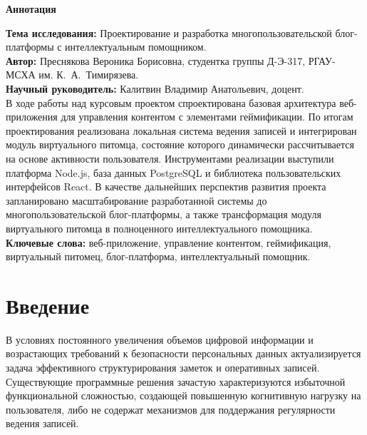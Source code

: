 \documentclass[a4paper,14pt]{extreport}
\begin{document}
\newpage
\thispagestyle{empty}
\begin{center}
  {\fontsize{16pt}{20pt}\selectfont\bfseries Аннотация\par}
\end{center}
\vspace{3mm}

\noindent\textbf{Тема исследования:} Проектирование и разработка многопользовательской блог-платформы с интеллектуальным помощником.\\[2mm]
\noindent\textbf{Автор:} Преснякова Вероника Борисовна, студентка группы Д-Э-317, РГАУ-МСХА им. К.~А.~Тимирязева.\\[2mm]
\noindent\textbf{Научный руководитель:} Калитвин Владимир Анатольевич, доцент.\\[4mm]
\indent В ходе работы над курсовым проектом спроектирована базовая архитектура веб-приложения для управления контентом с элементами геймификации. По итогам проектирования реализована локальная система ведения записей и интегрирован модуль виртуального питомца, состояние которого динамически рассчитывается на основе активности пользователя. Инструментами реализации выступили платформа Node.js, база данных PostgreSQL и библиотека пользовательских интерфейсов React. В качестве дальнейших перспектив развития проекта запланировано масштабирование разработанной системы до многопользовательской блог-платформы, а также трансформация модуля виртуального питомца в полноценного интеллектуального помощника.\\[3mm]
\noindent\textbf{Ключевые слова:} веб-приложение, управление контентом, геймификация, виртуальный питомец, блог-платформа, интеллектуальный помощник.
\newpage

\tableofcontents
\newpage

\chapter*{Введение}

В условиях постоянного увеличения объемов цифровой информации и возрастающих требований к безопасности персональных данных актуализируется задача эффективного структурирования заметок и оперативных записей. Существующие программные решения зачастую характеризуются избыточной функциональной сложностью, создающей повышенную когнитивную нагрузку на пользователя, либо не содержат механизмов для поддержания регулярности ведения записей.
\end{document}
